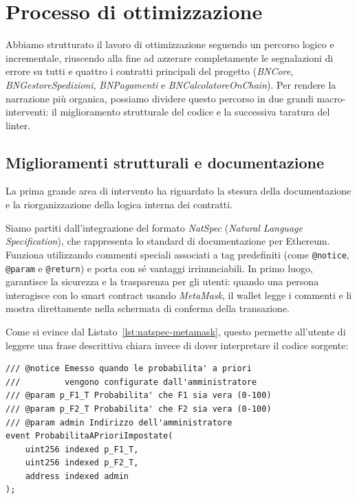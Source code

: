\section{Processo di ottimizzazione}

Abbiamo strutturato il lavoro di ottimizzazione seguendo un percorso logico e incrementale, riuscendo alla fine ad azzerare completamente le segnalazioni di errore su tutti e quattro i contratti principali del progetto (\textit{BNCore}, \textit{BNGestoreSpedizioni}, \textit{BNPagamenti} e \textit{BNCalcolatoreOnChain}). Per rendere la narrazione più organica, possiamo dividere questo percorso in due grandi macro-interventi: il miglioramento strutturale del codice e la successiva taratura del linter.

\subsection{Miglioramenti strutturali e documentazione}

La prima grande area di intervento ha riguardato la stesura della documentazione e la riorganizzazione della logica interna dei contratti. 

Siamo partiti dall'integrazione del formato \textit{NatSpec} (\textit{Natural Language Specification}), che rappresenta lo standard di documentazione per Ethereum. Funziona utilizzando commenti speciali associati a tag predefiniti (come \texttt{@notice}, \texttt{@param} e \texttt{@return}) e porta con sé vantaggi irrinunciabili. In primo luogo, garantisce la sicurezza e la trasparenza per gli utenti: quando una persona interagisce con lo smart contract usando \textit{MetaMask}, il wallet legge i commenti e li mostra direttamente nella schermata di conferma della transazione. 



Come si evince dal Listato~\ref{lst:natspec-metamask}, questo permette all'utente di leggere una frase descrittiva chiara invece di dover interpretare il codice sorgente:

\begin{lstlisting}[language=Solidity, caption={Esempio NatSpec per MetaMask}, label=lst:natspec-metamask]
/// @notice Emesso quando le probabilita' a priori 
///         vengono configurate dall'amministratore
/// @param p_F1_T Probabilita' che F1 sia vera (0-100)
/// @param p_F2_T Probabilita' che F2 sia vera (0-100)
/// @param admin Indirizzo dell'amministratore
event ProbabilitaAPrioriImpostate(
    uint256 indexed p_F1_T, 
    uint256 indexed p_F2_T, 
    address indexed admin
);
\end{lstlisting}


